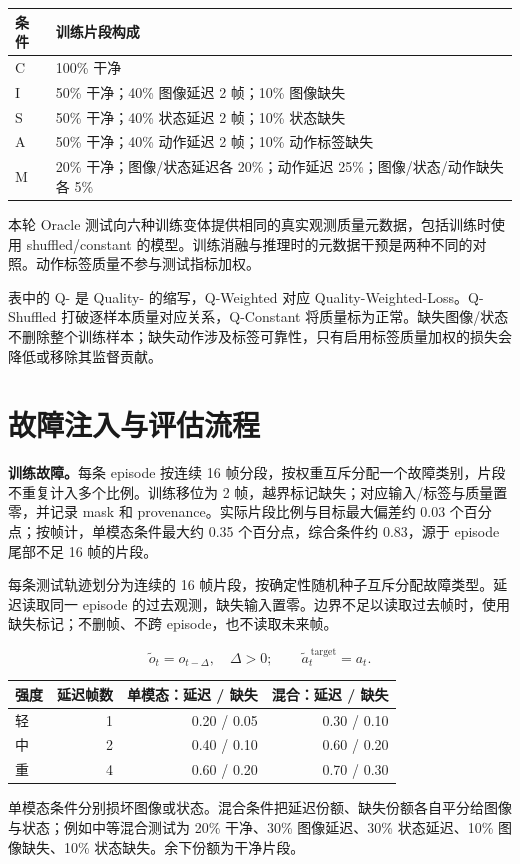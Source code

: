 \documentclass[11pt,a4paper,fontset=fandol]{ctexart}
\newcommand{\note}[1]{\begin{tcolorbox}[colback=panel,colframe=rule,boxrule=0.5pt,arc=1mm]#1\end{tcolorbox}}
\begin{document}
\begin{center}
\footnotesize
\begin{tabular}{lp{133mm}}
\toprule
条件 & 训练片段构成 \\
\midrule
C & 100\% 干净 \\
I & 50\% 干净；40\% 图像延迟 2 帧；10\% 图像缺失 \\
S & 50\% 干净；40\% 状态延迟 2 帧；10\% 状态缺失 \\
A & 50\% 干净；40\% 动作延迟 2 帧；10\% 动作标签缺失 \\
M & 20\% 干净；图像/状态延迟各 20\%；动作延迟 25\%；图像/状态/动作缺失各 5\% \\
\bottomrule
\end{tabular}
\end{center}
\note{本轮 Oracle 测试向六种训练变体提供相同的真实观测质量元数据，包括训练时使用 shuffled/constant 的模型。训练消融与推理时的元数据干预是两种不同的对照。动作标签质量不参与测试指标加权。}
表中的 Q- 是 Quality- 的缩写，Q-Weighted 对应 Quality-Weighted-Loss。Q-Shuffled 打破逐样本质量对应关系，Q-Constant 将质量标为正常。缺失图像/状态不删除整个训练样本；缺失动作涉及标签可靠性，只有启用标签质量加权的损失会降低或移除其监督贡献。

\clearpage\section{故障注入与评估流程}
\textbf{训练故障。}每条 episode 按连续 16 帧分段，按权重互斥分配一个故障类别，片段不重复计入多个比例。训练移位为 2 帧，越界标记缺失；对应输入/标签与质量置零，并记录 mask 和 provenance。实际片段比例与目标最大偏差约 0.03 个百分点；按帧计，单模态条件最大约 0.35 个百分点，综合条件约 0.83，源于 episode 尾部不足 16 帧的片段。

每条测试轨迹划分为连续的 16 帧片段，按确定性随机种子互斥分配故障类型。延迟读取同一 episode 的过去观测，缺失输入置零。边界不足以读取过去帧时，使用缺失标记；不删帧、不跨 episode，也不读取未来帧。

\[\widetilde{o}_t=o_{t-\Delta},\quad \Delta>0;\qquad \widetilde{a}^{\,\mathrm{target}}_t=a_t.\]
\begin{center}
\footnotesize
\begin{tabular}{lrrr}
\toprule
强度 & 延迟帧数 & 单模态：延迟 / 缺失 & 混合：延迟 / 缺失 \\
\midrule
轻 & 1 & 0.20 / 0.05 & 0.30 / 0.10 \\
中 & 2 & 0.40 / 0.10 & 0.60 / 0.20 \\
重 & 4 & 0.60 / 0.20 & 0.70 / 0.30 \\
\bottomrule
\end{tabular}
\end{center}
单模态条件分别损坏图像或状态。混合条件把延迟份额、缺失份额各自平分给图像与状态；例如中等混合测试为 20\% 干净、30\% 图像延迟、30\% 状态延迟、10\% 图像缺失、10\% 状态缺失。余下份额为干净片段。
\end{document}
